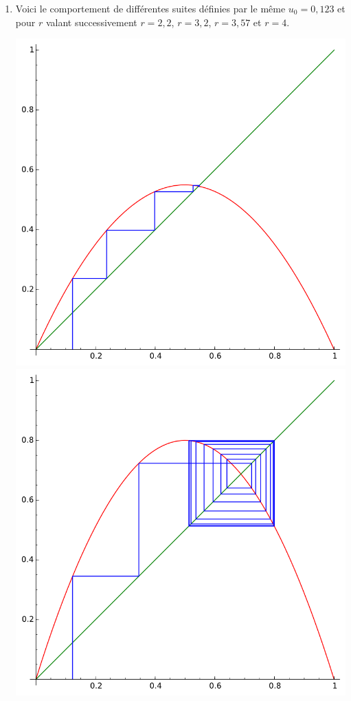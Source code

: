 \documentclass[class=report,crop=false]{standalone}
\begin{document}
\begin{enumerate}
  \item 
  Voici le comportement de différentes suites définies par le même $u_0=0,123$ et pour $r$ valant 
  successivement $r=2,2$, $r=3,2$, $r=3,57$ et $r=4$.
  \begin{center}
  \includegraphics[scale=0.3]{figures/chaos1}\quad
  \includegraphics[scale=0.3]{figures/chaos2}\\[3mm]

\end{center}
\end{enumerate}
\end{document}
